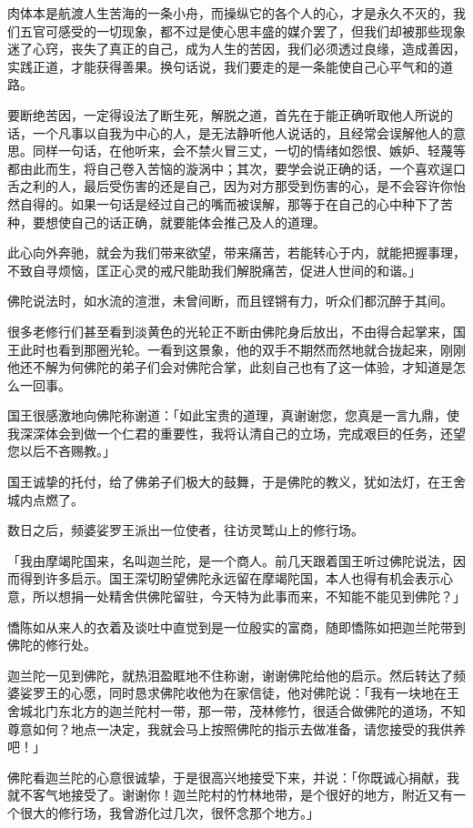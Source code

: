 \documentclass[twoside,openany]{book}
\begin{document}
肉体本是航渡人生苦海的一条小舟，而操纵它的各个人的心，才是永久不灭的，我们五官可感受的一切现象，都不过是使心思丰盛的媒介罢了，但我们却被那些现象迷了心窍，丧失了真正的自己，成为人生的苦因，我们必须透过良缘，造成善因，实践正道，才能获得善果。换句话说，我们要走的是一条能使自己心平气和的道路。

要断绝苦因，一定得设法了断生死，解脱之道，首先在于能正确听取他人所说的话，一个凡事以自我为中心的人，是无法静听他人说话的，且经常会误解他人的意思。同样一句话，在他听来，会不禁火冒三丈，一切的情绪如怨恨、嫉妒、轻蔑等都由此而生，将自己卷入苦恼的漩涡中；其次，要学会说正确的话，一个喜欢逞口舌之利的人，最后受伤害的还是自己，因为对方那受到伤害的心，是不会容许你怡然自得的。如果一句话是经过自己的嘴而被误解，那等于在自己的心中种下了苦种，要想使自己的话正确，就要能体会推己及人的道理。

此心向外奔驰，就会为我们带来欲望，带来痛苦，若能转心于内，就能把握事理，不致自寻烦恼，匡正心灵的戒尺能助我们解脱痛苦，促进人世间的和谐。」

佛陀说法时，如水流的渲泄，未曾间断，而且铿锵有力，听众们都沉醉于其间。

很多老修行们甚至看到淡黄色的光轮正不断由佛陀身后放出，不由得合起掌来，国王此时也看到那圈光轮。一看到这景象，他的双手不期然而然地就合拢起来，刚刚他还不解为何佛陀的弟子们会对佛陀合掌，此刻自己也有了这一体验，才知道是怎么一回事。

国王很感激地向佛陀称谢道：「如此宝贵的道理，真谢谢您，您真是一言九鼎，使我深深体会到做一个仁君的重要性，我将认清自己的立场，完成艰巨的任务，还望您以后不吝赐教。」

国王诚挚的托付，给了佛弟子们极大的鼓舞，于是佛陀的教义，犹如法灯，在王舍城内点燃了。

数日之后，频婆娑罗王派出一位使者，往访灵鹫山上的修行场。

「我由摩竭陀国来，名叫迦兰陀，是一个商人。前几天跟着国王听过佛陀说法，因而得到许多启示。国王深切盼望佛陀永远留在摩竭陀国，本人也得有机会表示心意，所以想捐一处精舍供佛陀留驻，今天特为此事而来，不知能不能见到佛陀？」

憍陈如从来人的衣着及谈吐中直觉到是一位殷实的富商，随即憍陈如把迦兰陀带到佛陀的修行处。

迦兰陀一见到佛陀，就热泪盈眶地不住称谢，谢谢佛陀给他的启示。然后转达了频婆娑罗王的心愿，同时恳求佛陀收他为在家信徒，他对佛陀说：「我有一块地在王舍城北门东北方的迦兰陀村一带，那一带，茂林修竹，很适合做佛陀的道场，不知尊意如何？地点一决定，我就会马上按照佛陀的指示去做准备，请您接受的我供养吧！」

佛陀看迦兰陀的心意很诚挚，于是很高兴地接受下来，并说：「你既诚心捐献，我就不客气地接受了。谢谢你！迦兰陀村的竹林地带，是个很好的地方，附近又有一个很大的修行场，我曾游化过几次，很怀念那个地方。」
\end{document}
